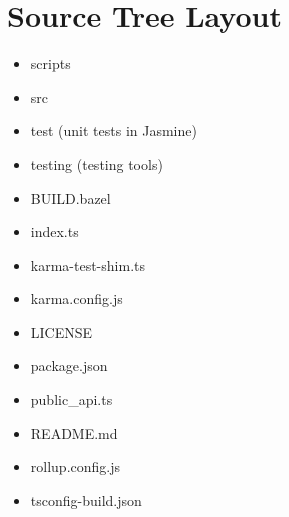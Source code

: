 \section{Source Tree Layout}


\begin{itemize}
  \item scripts
  \item src
  \item test (unit tests in Jasmine)
  \item testing (testing tools)
\end{itemize}


\begin{itemize}
  \item BUILD.bazel
  \item index.ts
  \item karma-test-shim.ts
  \item karma.config.js
  \item LICENSE
  \item package.json
  \item public\_api.ts
  \item README.md
  \item rollup.config.js
  \item tsconfig-build.json
\end{itemize}
